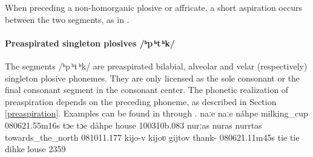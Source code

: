 When preceding a non-homorganic plosive or affricate, a short aspiration occurs between the two segments, as in . 



\paragraph{Preaspirated singleton plosives /ʰp\,ʰt\,ʰk/}
The segments \mbox{/ʰp\,ʰt\,ʰk/} are preaspirated bilabial, alveolar and velar (respectively) singleton plosive phonemes. They are only licensed as the sole consonant or the final consonant segment in the consonant center. 
The phonetic realization of preaspiration depends on the preceding phoneme, as described in Section \ref{preaspiration}. 
Examples can be found in  through . 
	{naːe}		{naːe}	{náhpe}	{milking\_cup\BS{}}	{080621}{.55m16s}
		{tɔe}		{tɔe}		{dåhpe}	{house\BS{}}		{100310b}{.083}
		{nurːas}	{nuras}	{nurrtas}	{towards\_the\_north}		{081011}{.177}
		{kijo-v}		{kijoʋ}		{gijtov}	{thank-}		{080621}{.11m45s}
		{tie}		{tie}		{dihke}	{louse\BS{}}		{2359}

